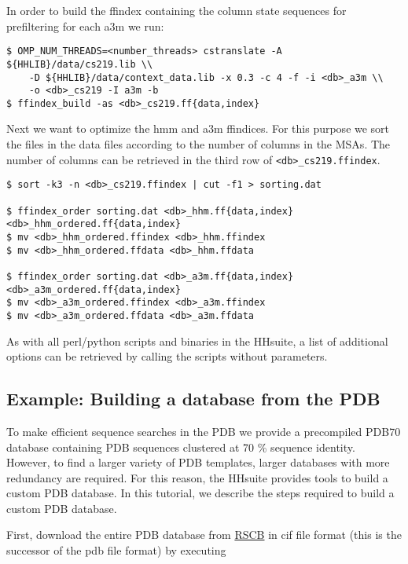 \documentclass[11pt,a4paper]{article}
\begin{document}
In order to build the ffindex containing the column state sequences for prefiltering for each a3m we run:

\begin{verbatim}
$ OMP_NUM_THREADS=<number_threads> cstranslate -A ${HHLIB}/data/cs219.lib \\
    -D ${HHLIB}/data/context_data.lib -x 0.3 -c 4 -f -i <db>_a3m \\
    -o <db>_cs219 -I a3m -b
$ ffindex_build -as <db>_cs219.ff{data,index}
\end{verbatim}

Next we want to optimize the hmm and a3m ffindices. For this purpose we sort the files in the
data files according to the number of columns in the MSAs. The number of columns can be retrieved
in the third row of \verb`<db>_cs219.ffindex`.

\begin{verbatim}
$ sort -k3 -n <db>_cs219.ffindex | cut -f1 > sorting.dat

$ ffindex_order sorting.dat <db>_hhm.ff{data,index} <db>_hhm_ordered.ff{data,index}
$ mv <db>_hhm_ordered.ffindex <db>_hhm.ffindex
$ mv <db>_hhm_ordered.ffdata <db>_hhm.ffdata

$ ffindex_order sorting.dat <db>_a3m.ff{data,index} <db>_a3m_ordered.ff{data,index}
$ mv <db>_a3m_ordered.ffindex <db>_a3m.ffindex
$ mv <db>_a3m_ordered.ffdata <db>_a3m.ffdata
\end{verbatim}

As with all perl/python scripts and binaries in the HHsuite, a list of additional options can be retrieved by calling the scripts without parameters.

\subsection*{Example: Building a database from the PDB}

To make efficient sequence searches in the PDB we provide a precompiled PDB70 database containing PDB sequences clustered at 70 \% sequence identity. However, to find a larger variety of PDB templates, larger databases with more redundancy are required. For this reason, the HHsuite provides tools to build a custom PDB database. In this tutorial, we describe the steps required to build a custom PDB database.

First, download the entire PDB database from \href{http://www.rcsb.org/pdb/static.do?p=download/ftp/index.html}{RSCB} in cif file format (this is the successor of the pdb file format) by executing
\end{document}
